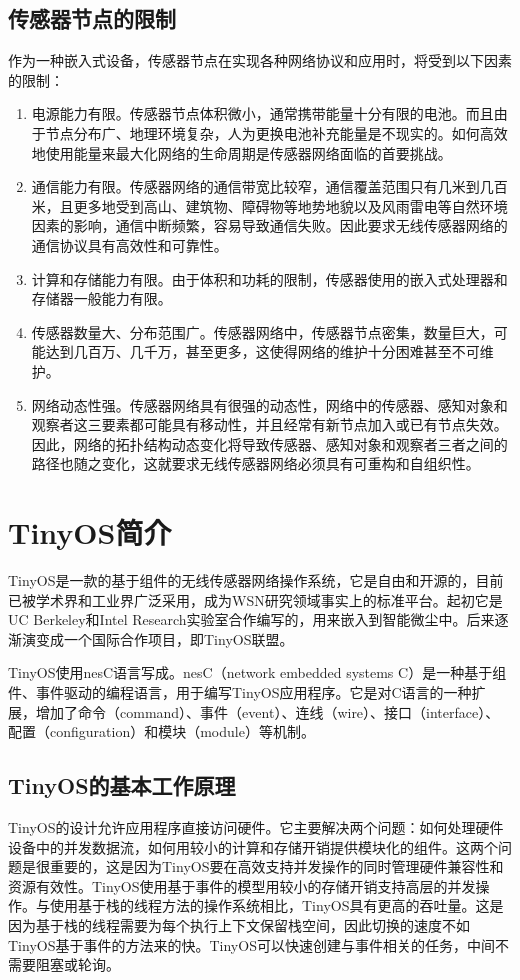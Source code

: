 \subsection{传感器节点的限制}
作为一种嵌入式设备，传感器节点在实现各种网络协议和应用时，将受到以下因素的限制：
\vspace{-10pt}
\begin{enumerate}
	\item 电源能力有限。传感器节点体积微小，通常携带能量十分有限的电池。而且由于节点分布广、地理环境复杂，人为更换电池补充能量是不现实的。如何高效地使用能量来最大化网络的生命周期是传感器网络面临的首要挑战。
	\item 通信能力有限。传感器网络的通信带宽比较窄，通信覆盖范围只有几米到几百米，且更多地受到高山、建筑物、障碍物等地势地貌以及风雨雷电等自然环境因素的影响，通信中断频繁，容易导致通信失败。因此要求无线传感器网络的通信协议具有高效性和可靠性。
	\item 计算和存储能力有限。由于体积和功耗的限制，传感器使用的嵌入式处理器和存储器一般能力有限。
	\item 传感器数量大、分布范围广。传感器网络中，传感器节点密集，数量巨大，可能达到几百万、几千万，甚至更多，这使得网络的维护十分困难甚至不可维护。
	\item 网络动态性强。传感器网络具有很强的动态性，网络中的传感器、感知对象和观察者这三要素都可能具有移动性，并且经常有新节点加入或已有节点失效。因此，网络的拓扑结构动态变化将导致传感器、感知对象和观察者三者之间的路径也随之变化，这就要求无线传感器网络必须具有可重构和自组织性。
\end{enumerate}

\section{TinyOS简介}
TinyOS是一款的基于组件的无线传感器网络操作系统，它是自由和开源的，目前已被学术界和工业界广泛采用，成为WSN研究领域事实上的标准平台。起初它是UC Berkeley和Intel Research实验室合作编写的，用来嵌入到智能微尘中。后来逐渐演变成一个国际合作项目，即TinyOS联盟。

TinyOS使用nesC语言写成。nesC（network embedded systems C）是一种基于组件、事件驱动的编程语言，用于编写TinyOS应用程序。它是对C语言的一种扩展，增加了命令（command）、事件（event）、连线（wire）、接口（interface）、配置（configuration）和模块（module）等机制。

\subsection{TinyOS的基本工作原理}
TinyOS的设计允许应用程序直接访问硬件。它主要解决两个问题：如何处理硬件设备中的并发数据流，如何用较小的计算和存储开销提供模块化的组件。这两个问题是很重要的，这是因为TinyOS要在高效支持并发操作的同时管理硬件兼容性和资源有效性。TinyOS使用基于事件的模型用较小的存储开销支持高层的并发操作。与使用基于栈的线程方法的操作系统相比，TinyOS具有更高的吞吐量。这是因为基于栈的线程需要为每个执行上下文保留栈空间，因此切换的速度不如TinyOS基于事件的方法来的快。TinyOS可以快速创建与事件相关的任务，中间不需要阻塞或轮询。

